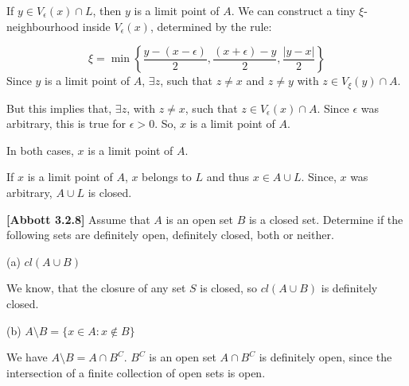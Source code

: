 \documentclass[10pt]{article}
\begin{document}
If $\displaystyle y\in V_{\epsilon }( x) \cap L$, then $\displaystyle y$ is a limit point of $\displaystyle A$. We can construct a tiny $\displaystyle \xi $-neighbourhood inside $\displaystyle V_{\epsilon }( x)$, determined by the rule:


\begin{equation*}
\xi =\min\left\{\frac{y-( x-\epsilon )}{2} ,\frac{( x+\epsilon ) -y}{2} ,\frac{|y-x|}{2}\right\}
\end{equation*}
Since $\displaystyle y$ is a limit point of $\displaystyle A$, $\displaystyle \exists z$, such that $\displaystyle z\neq x$ and $\displaystyle z\neq y$ with $\displaystyle z\in V_{\xi }( y) \cap A$. 



But this implies that, $\displaystyle \exists z$, with $\displaystyle z\neq x$, such that $\displaystyle z\in V_{\epsilon }( x) \cap A$. Since $\displaystyle \epsilon $ was arbitrary, this is true for $\displaystyle \epsilon  >0$. So, $\displaystyle x$ is a limit point of $\displaystyle A$.



In both cases, $\displaystyle x$ is a limit point of $\displaystyle A$. \ 



If $\displaystyle x$ is a limit point of $\displaystyle A$, $\displaystyle x$ belongs to $\displaystyle L$ and thus $\displaystyle x\in A\cup L$. Since, $\displaystyle x$ was arbitrary, $\displaystyle A\cup L$ is closed.



\textbf{[Abbott 3.2.8] }Assume that $\displaystyle A$ is an open set $\displaystyle B$ is a closed set. Determine if the following sets are definitely open, definitely closed, both or neither.



(a) $\displaystyle cl( A\cup B)$



We know, that the closure of any set $\displaystyle S$ is closed, so $\displaystyle cl( A\cup B)$ is definitely closed.



(b) $\displaystyle A\setminus B=\{x\in A:x\notin B\}$



We have $\displaystyle A\setminus B=A\cap B^{C}$. $\displaystyle B^{C}$ is an open set $\displaystyle A\cap B^{C}$ is definitely open, since the intersection of a finite collection of open sets is open. 
\end{document}
